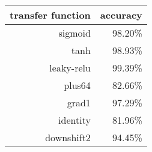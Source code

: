 \begin{tabular}{rr}
{\bf transfer function} & {\bf accuracy} \\
\hline 
sigmoid & 98.20\% \\
tanh & 98.93\% \\
leaky-relu & 99.39\% \\
plus64 & 82.66\% \\
grad1 & 97.29\% \\
identity & 81.96\% \\
downshift2 & 94.45\% \\
\end{tabular}
